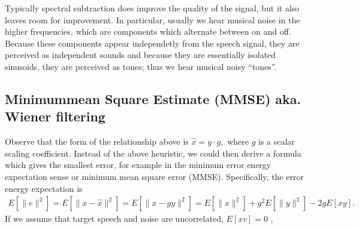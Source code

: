 \documentclass[letterpaper,10pt,english]{jupyterBook}
\begin{document}
\sphinxAtStartPar
Typically spectral subtraction does improve the quality of the signal, but it also leaves room for improvement. In particular, usually we hear musical noise in the higher frequencies, which are components which alternate between on and off. Because these components appear independetly from the speech signal, they are perceived as independent sounds and because they are essentially isolated sinusoids, they are perceived as tones; thus we hear musical noisy “tones”.


\subsection{Minimum\sphinxhyphen{}mean Square Estimate (MMSE) aka. Wiener filtering}
\label{\detokenize{Enhancement/Noise_attenuation:minimum-mean-square-estimate-mmse-aka-wiener-filtering}}
\sphinxAtStartPar
Observe that the form of the relationship above is \( \hat x = y\cdot
g, \) where \(g\) is a scalar scaling coefficient. Instead of the above
heuristic, we could then derive a formula which gives the smallest
error, for example in the minimum error energy expectation sense or
minimum mean square error (MMSE). Specifically, the error energy
expectation is
\begin{equation*}
\begin{split} E\left[\|e\|^2\right] = E\left[\|x-\hat x\|^2\right] =
E\left[\|x-gy\|^2\right] = E\left[\|x\|^2\right] + g^2
E\left[\|y\|^2\right] - 2g E\left[xy\right]. \end{split}
\end{equation*}
\sphinxAtStartPar
If we assume that target speech and noise are uncorrelated, \(
E\left[xv\right]=0 \) ,
\end{document}
